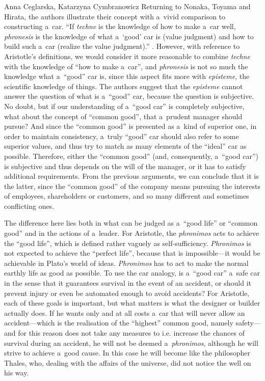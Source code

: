 \begin{artengenv2auth}{Anna Ceglarska, Katarzyna Cymbranowicz}
Returning to Nonaka, Toyama and Hirata, the authors illustrate their concept with a~vivid comparison to constructing a~car. ``If \textit{techne} is the knowledge of how to make a~car well, \textit{phronesis} is the knowledge of what a~‘good' car is (value judgment) and how to build such a~car (realize the value judgment).'' 
\parencite[][p.54]{nonaka_managing_2008}. %
 However, with reference to Aristotle's definitions, we would consider it more reasonable to combine \textit{techne} with the knowledge of ``how to make a~car'', and \textit{phronesis} is not so much the knowledge what a~``good'' car is, since this aspect fits more with \textit{episteme}, the scientific knowledge of things. The authors suggest that the \textit{episteme} cannot answer the question of what is a~``good'' car, because the question is subjective. No doubt, but if our understanding of a~``good car'' is completely subjective, what about the concept of ``common good'', that a~prudent manager should pursue? And since the ``common good'' is presented as a~kind of superior one, in order to maintain consistency, a~truly ``good'' car should also refer to some superior values, and thus try to match as many elements of the ``ideal'' car as possible. Therefore, either the ``common good'' (and, consequently, a~``good car'') is subjective and thus depends on the will of the manager, or it has to satisfy additional requirements. From the previous arguments, we can conclude that it is the latter, since the ``common good'' of the company means pursuing the interests of employees, shareholders or customers, and so many different and sometimes conflicting ones.



The difference here lies both in what can be judged as a~``good life'' or ``common good'' and in the actions of a~leader. For Aristotle, the \textit{phronimos} acts to achieve the ``good life'', which is defined rather vaguely as self-sufficiency. \textit{Phronimos} is not expected to achieve the ``perfect life'', because that is impossible---it would be achievable in Plato's world of ideas. \textit{Phronimos} has to act to make the normal earthly life as good as possible. To use the car analogy, is a~``good car'' a~safe car in the sense that it guarantees survival in the event of an accident, or should it prevent injury or even be automated enough to avoid accidents? For Aristotle, each of these goals is important, but what matters is what the designer or builder actually does. If he wants only and at all costs a~car that will never allow an accident---which is the realisation of the ``highest'' common good, namely safety---and for this reason does not take any measures to i.e. increase the chances of survival during an accident, he will not be deemed a~\textit{phronimos}, although he will strive to achieve a~good cause. In this case he will become like the philosopher Thales, who, dealing with the affairs of the universe, did not notice the well on his way.




\end{artengenv2auth}
